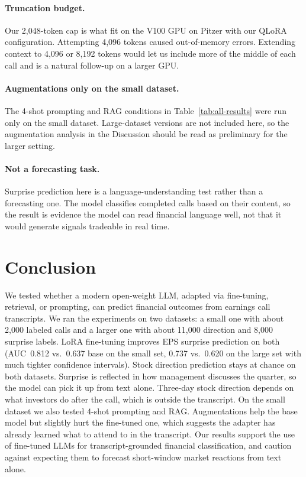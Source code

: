 \documentclass[11pt]{article}
\begin{document}
\paragraph{Truncation budget.}
Our 2{,}048-token cap is what fit on the V100 GPU on Pitzer with
our QLoRA configuration. Attempting 4{,}096 tokens caused
out-of-memory errors. Extending context to 4{,}096 or 8{,}192
tokens would let us include more of the middle of each call and is
a natural follow-up on a larger GPU.

\paragraph{Augmentations only on the small dataset.}
The 4-shot prompting and RAG conditions in
Table~\ref{tab:all-results} were run only on the small dataset.
Large-dataset versions are not included here, so the augmentation
analysis in the Discussion should be read as preliminary for the
larger setting.

\paragraph{Not a forecasting task.}
Surprise prediction here is a language-understanding test rather
than a forecasting one. The model classifies completed calls based
on their content, so the result is evidence the model can read
financial language well, not that it would generate signals
tradeable in real time.

\section{Conclusion}

We tested whether a modern open-weight LLM, adapted via
fine-tuning, retrieval, or prompting, can predict financial
outcomes from earnings call transcripts. We ran the experiments on
two datasets: a small one with about 2{,}000 labeled calls and a
larger one with about 11{,}000 direction and 8{,}000 surprise
labels. LoRA fine-tuning improves EPS surprise prediction on both
(AUC~0.812 vs.\ 0.637 base on the small set, 0.737 vs.\ 0.620 on
the large set with much tighter confidence intervals). Stock
direction prediction stays at chance on both datasets. Surprise is
reflected in how management discusses the quarter, so the model
can pick it up from text alone. Three-day stock
direction depends on what investors do after the call, which is
outside the transcript. On the small dataset we also tested 4-shot
prompting and RAG. Augmentations help the base model but slightly
hurt the fine-tuned one, which suggests the adapter has already
learned what to attend to in the transcript. Our results support
the use of fine-tuned LLMs for transcript-grounded financial
classification, and caution against expecting them to forecast
short-window market reactions from text alone.
\end{document}
